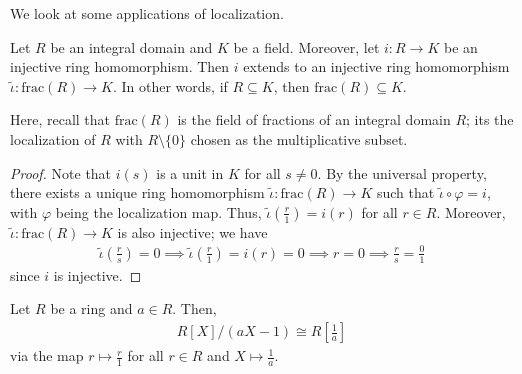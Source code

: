 We look at some applications of localization.

\begin{proposition}
    Let $R$ be an integral domain and $K$ be a field. Moreover, let $i:R \to K$ be an injective ring homomorphism. Then $i$ extends to an injective ring homomorphism $\tilde{\iota} : \mathrm{frac}(R) \to K$. In other words, if $R \subseteq K$, then $\mathrm{frac}(R) \subseteq K$.
\end{proposition}
Here, recall that $\mathrm{frac}(R)$ is the field of fractions of an integral domain $R$; its the localization of $R$ with $R \setminus \{0\}$ chosen as the multiplicative subset.
\begin{proof}
    Note that $i(s)$ is a unit in $K$ for all $s \neq 0$. By the universal property, there exists a unique ring homomorphism $\tilde{\iota} : \mathrm{frac}(R) \to K$ such that $\tilde{\iota} \circ \varphi = i$, with $\varphi$ being the localization map. Thus, $\tilde{\iota} (\frac{r}{1}) = i(r)$ for all $r \in R$. Moreover, $\tilde{\iota} : \mathrm{frac}(R) \to K$ is also injective; we have
    \begin{align}
        \tilde{\iota}(\frac{r}{s}) = 0 \implies \tilde{\iota}(\frac{r}{1}) = i(r) = 0 \implies r = 0 \implies \frac{r}{s} = \frac{0}{1}
    \end{align}
    since $i$ is injective.
\end{proof}

\begin{proposition}
    Let $R$ be a ring and $a \in R$. Then,
    \begin{align}
        R[X] / (aX-1) \cong R[\frac{1}{a}]
    \end{align}
    via the map $r \mapsto \frac{r}{1}$ for all $r \in R$ and $X \mapsto \frac{1}{a}$.
\end{proposition}

